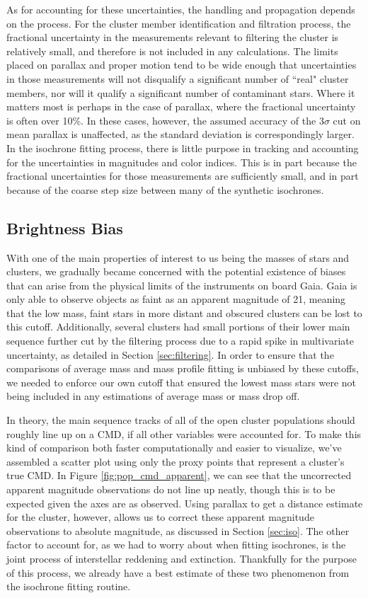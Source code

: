 \documentclass[onecolumn,table,xcdraw,super]{aastex631}
\begin{document}
As for accounting for these uncertainties, the handling and propagation depends on the process. For the cluster member identification and filtration process, the fractional uncertainty in the measurements relevant to filtering the cluster is relatively small, and therefore is not included in any calculations. The limits placed on parallax and proper motion tend to be wide enough that uncertainties in those measurements will not disqualify a significant number of ``real" cluster members, nor will it qualify a significant number of contaminant stars. Where it matters most is perhaps in the case of parallax, where the fractional uncertainty is often over 10\%. In these cases, however, the assumed accuracy of the $3\sigma$ cut on mean parallax is unaffected, as the standard deviation is correspondingly larger. In the isochrone fitting process, there is little purpose in tracking and accounting for the uncertainties in magnitudes and color indices. This is in part because the fractional uncertainties for those measurements are sufficiently small, and in part because of the coarse step size between many of the synthetic isochrones.


\subsection{Brightness Bias} \label{sec:bias}

With one of the main properties of interest to us being the masses of stars and clusters, we gradually became concerned with the potential existence of biases that can arise from the physical limits of the instruments on board Gaia. Gaia is only able to observe objects as faint as an apparent magnitude of 21, meaning that the low mass, faint stars in more distant and obscured clusters can be lost to this cutoff. Additionally, several clusters had small portions of their lower main sequence further cut by the filtering process due to a rapid spike in multivariate uncertainty, as detailed in Section \ref{sec:filtering}. In order to ensure that the comparisons of average mass and mass profile fitting is unbiased by these cutoffs, we needed to enforce our own cutoff that ensured the lowest mass stars were not being included in any estimations of average mass or mass drop off.

In theory, the main sequence tracks of all of the open cluster populations should roughly line up on a CMD, if all other variables were accounted for. To make this kind of comparison both faster computationally and easier to visualize, we've assembled a scatter plot using only the proxy points that represent a cluster's true CMD. In Figure \ref{fig:pop_cmd_apparent}, we can see that the uncorrected apparent magnitude observations do not line up neatly, though this is to be expected given the axes are as observed. Using parallax to get a distance estimate for the cluster, however, allows us to correct these apparent magnitude observations to absolute magnitude, as discussed in Section \ref{sec:iso}. The other factor to account for, as we had to worry about when fitting isochrones, is the joint process of interstellar reddening and extinction. Thankfully for the purpose of this process, we already have a best estimate of these two phenomenon from the isochrone fitting routine. 
\end{document}
